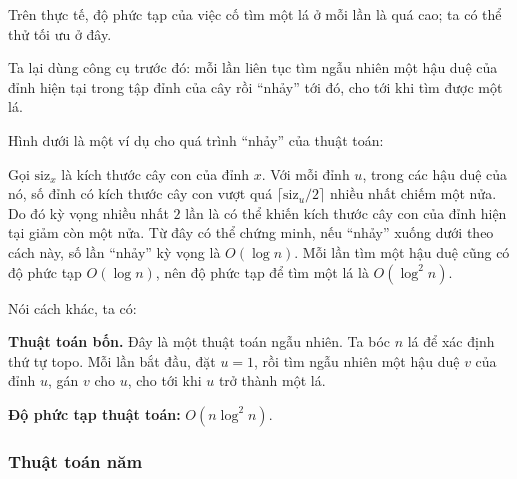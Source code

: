 \documentclass[11pt]{article}
\begin{document}
Trên thực tế, độ phức tạp của việc cố tìm một lá ở mỗi lần là quá cao; ta có
thể thử tối ưu ở đây.

Ta lại dùng công cụ trước đó: mỗi lần liên tục tìm ngẫu nhiên một hậu duệ của
đỉnh hiện tại trong tập đỉnh của cây rồi ``nhảy'' tới đó, cho tới khi tìm được
một lá.

Hình dưới là một ví dụ cho quá trình ``nhảy'' của thuật toán:

\begin{center}
\end{center}

Gọi \(\mathrm{siz}_x\) là kích thước cây con của đỉnh \(x\). Với mỗi đỉnh \(u\),
trong các hậu duệ của nó, số đỉnh có kích thước cây con vượt quá
\(\lceil \mathrm{siz}_u/2\rceil\) nhiều nhất chiếm một nửa. Do đó kỳ vọng nhiều
nhất \(2\) lần là có thể khiến kích thước cây con của đỉnh hiện tại giảm còn
một nửa. Từ đây có thể chứng minh, nếu ``nhảy'' xuống dưới theo cách này, số
lần ``nhảy'' kỳ vọng là \(O(\log n)\). Mỗi lần tìm một hậu duệ cũng có độ phức
tạp \(O(\log n)\), nên độ phức tạp để tìm một lá là \(O(\log^2 n)\).

Nói cách khác, ta có:

\textbf{Thuật toán bốn.} Đây là một thuật toán ngẫu nhiên. Ta bóc \(n\) lá để
xác định thứ tự topo. Mỗi lần bắt đầu, đặt \(u=1\), rồi tìm ngẫu nhiên một hậu
duệ \(v\) của đỉnh \(u\), gán \(v\) cho \(u\), cho tới khi \(u\) trở thành một
lá.

\textbf{Độ phức tạp thuật toán:} \(O(n\log^2 n)\).

\subsubsection{Thuật toán năm}
\end{document}
